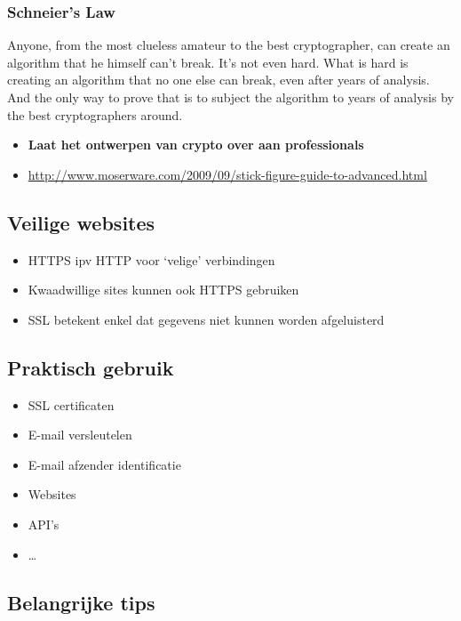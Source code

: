 \documentclass{article}
\newcommand{\bold}[1]{\textbf{#1}}
\begin{document}
\subsubsection{Schneier's Law}

Anyone, from the most clueless amateur to the best cryptographer, 
can create an algorithm that he himself can't break. 
It's not even hard. What is hard is creating an algorithm that no one else can break, 
even after years of analysis. 
And the only way to prove that is to subject the algorithm to years of analysis by the best cryptographers around.


\begin{itemize}
    \item \bold{Laat het ontwerpen van crypto over aan professionals}
    \item \url{http://www.moserware.com/2009/09/stick-figure-guide-to-advanced.html}
\end{itemize}

\subsection{Veilige websites}

\begin{itemize}
    \item HTTPS ipv HTTP voor `velige' verbindingen
    \item Kwaadwillige sites kunnen ook HTTPS gebruiken
    \item SSL betekent enkel dat gegevens niet kunnen worden afgeluisterd
\end{itemize}

\subsection{Praktisch gebruik}

\begin{itemize}
    \item SSL certificaten
    \item E-mail versleutelen
    \item E-mail afzender identificatie
    \item Websites
    \item API's
    \item \dots
\end{itemize}

\subsection{Belangrijke tips}
\end{document}
